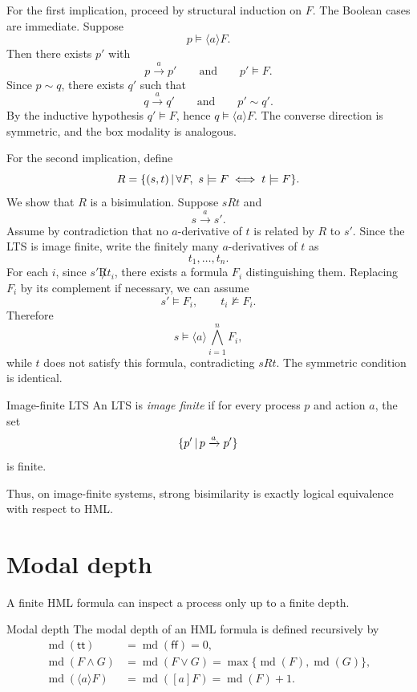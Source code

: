 \documentclass[a4paper]{article}
\newcommand{\ttt}{\mathsf{tt}}
\newcommand{\fff}{\mathsf{ff}}
\newcommand{\md}{\operatorname{md}}
\newcommand{\trans}[1]{\xrightarrow{#1}}
\begin{document}
\begin{snippetproof}{}
    For the first implication, proceed by structural induction on \(F\).
    The Boolean cases are immediate.
    Suppose
    \[
        p\models\langle a\rangle F.
    \]
    Then there exists \(p'\) with
    \[
        p\trans{a}p'
        \qquad\text{and}\qquad
        p'\models F.
    \]
    Since \(p\sim q\), there exists \(q'\) such that
    \[
        q\trans{a}q'
        \qquad\text{and}\qquad
        p'\sim q'.
    \]
    By the inductive hypothesis \(q'\models F\), hence \(q\models\langle a\rangle F\).
    The converse direction is symmetric, and the box modality is analogous.

    For the second implication, define
    \[
        R=\{(s,t)\,|\,
        \forall F,\ s\models F\iff t\models F\}.
    \]
    We show that \(R\) is a bisimulation.
    Suppose \(sRt\) and
    \[
        s\trans{a}s'.
    \]
    Assume by contradiction that no \(a\)-derivative of \(t\) is related by \(R\) to \(s'\).
    Since the LTS is image finite, write the finitely many \(a\)-derivatives of \(t\) as
    \[
        t_1,\ldots,t_n.
    \]
    For each \(i\), since \(s'\not R t_i\), there exists a formula \(F_i\) distinguishing them.
    Replacing \(F_i\) by its complement if necessary, we can assume
    \[
        s'\models F_i,
        \qquad
        t_i\not\models F_i.
    \]
    Therefore
    \[
        s\models
        \langle a\rangle
        \bigwedge_{i=1}^n F_i,
    \]
    while \(t\) does not satisfy this formula, contradicting \(sRt\).
    The symmetric condition is identical.
\end{snippetproof}

\begin{snippetdefinition}{Image-finite LTS}
    An LTS is \emph{image finite} if for every process \(p\) and action \(a\), the set
    \[
        \{p'\suchthat p\trans{a}p'\}
    \]
    is finite.
\end{snippetdefinition}

Thus, on image-finite systems, strong bisimilarity is exactly logical equivalence with respect to HML.

\section{Modal depth}

A finite HML formula can inspect a process only up to a finite depth.

\begin{snippetdefinition}{Modal depth}
    The modal depth of an HML formula is defined recursively by
    \begin{align*}
        \md(\ttt)&=\md(\fff)=0,\\
        \md(F\land G)&=\md(F\lor G)=\max\{\md(F),\md(G)\},\\
        \md(\langle a\rangle F)&=\md([a]F)=\md(F)+1.
    \end{align*}
\end{snippetdefinition}
\end{document}
